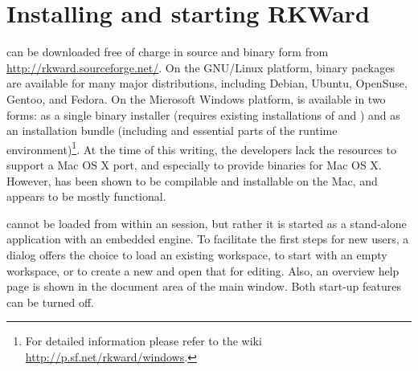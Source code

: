 \section{Installing and starting RKWard}
\label{sec:installing_starting_RKWard}
 can be downloaded free of charge in source and binary form from \url{http://rkward.sourceforge.net/}. 
On the GNU/Linux platform, binary packages are available for many major distributions,
including Debian, Ubuntu, OpenSuse, Gentoo, and Fedora. On the Microsoft Windows
platform,  is available in two forms: as a single binary
installer (requires existing installations of
 and ) and
as an installation bundle (including  and
essential parts of the  runtime environment)\footnote{For detailed information please refer to the 
 wiki \url{http://p.sf.net/rkward/windows}.}. At the time of
this writing, the developers lack the resources to support a Mac OS X
port, and especially to provide binaries for Mac OS X. However, 
has been shown to be compilable and installable on the Mac, and appears
to be mostly functional.

 cannot be loaded from within an 
session, but rather it is started as a stand-alone application with an
embedded  engine. To facilitate the first
steps for new users, a dialog offers the choice to load an existing
workspace, to start with an empty workspace, or to create a new
 and open that for editing. Also, an overview help page is
shown in the document area of the main window. Both start-up features
can be turned off.
